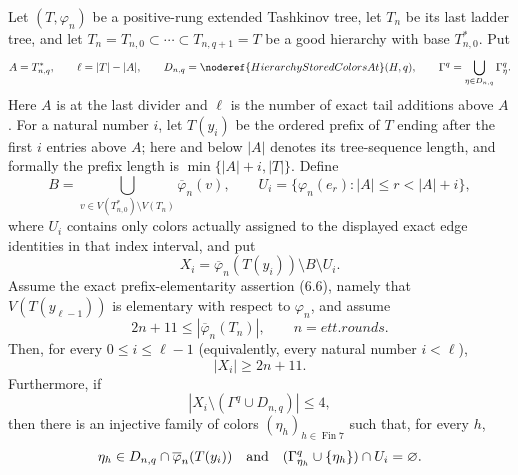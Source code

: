 \begin{lemma}
Let $(T,\varphi_n)$ be a positive-rung extended Tashkinov tree, let
$T_n$ be its last ladder tree, and let
$T_n=T_{n,0}\subset\cdots\subset T_{n,q+1}=T$ be a good hierarchy with
base $T_{n,0}^{*}$.  Put
\[
 A=T_{n,q}^{*},\qquad \ell=|T|-|A|,\qquad
 D_{n,q}=\noderef{HierarchyStoredColorsAt}(H,q),
 \qquad
 \Gamma^q=\bigcup_{\eta\in D_{n,q}}\Gamma^q_\eta.
\]
Here $A$ is  at the last divider and
$\ell$ is the number of exact tail additions above $A$.  For a natural number $i$, let
$T(y_i)$ be the ordered prefix of $T$ ending after the first $i$ entries
above $A$; here and below $|A|$ denotes its tree-sequence length, and
formally the prefix length is
$\min\{|A|+i,|T|\}$.  Define
\[
 B=\bigcup_{v\in V(T_{n,0}^{*})\setminus V(T_n)}
       \overline\varphi_n(v),
 \qquad
 U_i=\{\varphi_n(e_r): |A|\le r<|A|+i\},
\]
where $U_i$ contains only colors actually assigned to the displayed exact
edge identities in that index interval, and put
\[
 X_i=\overline\varphi_n(T(y_i))\setminus B\setminus U_i.
\]
Assume the exact prefix-elementarity assertion (6.6), namely that
$V(T(y_{\ell-1}))$ is elementary with respect to $\varphi_n$, and assume
\[
 2n+11\le |\overline\varphi_n(T_n)|,
 \qquad n=\mathit{ett.rounds}.
\]
Then, for every $0\le i\le \ell-1$ (equivalently, every natural number
$i<\ell$),
\[
                         |X_i|\ge 2n+11.                 \tag{1}
\]
Furthermore, if
\[
             |X_i\setminus(\Gamma^q\cup D_{n,q})|\le4, \tag{2}
\]
then there is an injective family of colors
$(\eta_h)_{h\in\operatorname{Fin}7}$ such that, for every $h$,
\[
 \eta_h\in D_{n,q}\cap\overline\varphi_n(T(y_i))
 \quad\hbox{and}\quad
 (\Gamma^q_{\eta_h}\cup\{\eta_h\})\cap U_i=\varnothing.
\]
\end{lemma}
